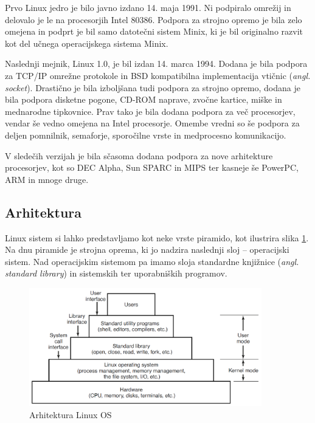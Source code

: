 \documentclass[a4paper,12pt,openright]{book}
\begin{document}
Prvo Linux jedro je bilo javno izdano 14. maja 1991. Ni podpiralo omrežij in delovalo je le na procesorjih Intel 80386.
Podpora za strojno opremo je bila zelo omejena in podprt je bil samo datotečni sistem Minix, ki je bil originalno razvit kot del učnega operacijskega sistema Minix.

Naslednji mejnik, Linux 1.0, je bil izdan 14. marca 1994. Dodana je bila podpora za TCP/IP omrežne protokole in BSD kompatibilna implementacija vtičnic (\textit{angl. socket}).
Drastično je bila izboljšana tudi podpora za strojno opremo, dodana je bila podpora disketne pogone, CD-ROM naprave, zvočne kartice, miške in mednarodne tipkovnice.
Prav tako je bila dodana podpora za več procesorjev, vendar še vedno omejena na Intel procesorje.
Omembe vredni so še podpora za deljen pomnilnik, semaforje, sporočilne vrste in medprocesno komunikacijo.

V sledečih verzijah je bila sčasoma dodana podpora za nove arhitekture procesorjev, kot so DEC Alpha, Sun SPARC in MIPS ter kasneje še PowerPC, ARM in mnoge druge.

\subsection{Arhitektura}

Linux sistem si lahko predstavljamo kot neke vrste piramido, kot ilustrira slika \ref{fig:linux_architecture}.
Na dnu piramide je strojna oprema, ki jo nadzira naslednji sloj -- operacijski sistem.
Nad operacijskim sistemom pa imamo sloja standardne knjižnice (\textit{angl. standard library}) in sistemskih ter uporabniških programov.

\begin{figure}[h!]
	\begin{center}
		\includegraphics[width=0.9\textwidth]{images/linux_layers.png}
	\end{center}
	\caption{Arhitektura Linux OS \cite{Tanenbaum_Bos_2023}}
	\label{fig:linux_architecture}
\end{figure}
\end{document}
